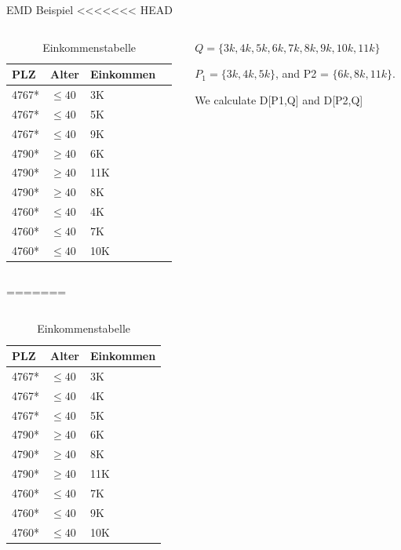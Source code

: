 \begin{frame} {EMD Beispiel}
<<<<<<< HEAD

\begin{columns}[T]
  \begin{column}{0.5\textwidth}
    \begin{table}[]
      \centering
      \label{tclossenessExample}
      \begin{tabular}{|l|l|l|l}
      \hline
      \textbf{PLZ}   & \textbf{Alter}    & \textbf{Einkommen} \\\hline
      4767* & $\le 40$ & 3K \\
      4767* & $\le 40$ & 5K \\
      4767* & $\le 40$ & 9K \\\hline
      4790* & $\ge 40$ & 6K \\
      4790* & $\ge 40$ & 11K \\
      4790* & $\ge 40$ & 8K \\\hline
      4760* & $\le 40$ & 4K \\
      4760* & $\le 40$ & 7K \\
      4760* & $\le 40$ & 10K \\\hline
      \end{tabular}
      \caption{Einkommenstabelle}
    \end{table}
    \end{column}

      \begin{column}{0.5\textwidth}
        $Q = \{3k, 4k, 5k, 6k, 7k, 8k, 9k, 10k, 11k\}$
        
        $P_1 = \{3k, 4k, 5k\}$, and P2 = \(\{6k, 8k, 11k\}\). 
        
        We calculate
        D[P1,Q] and D[P2,Q]
    \end{column}
\end{columns}
=======
	
	\begin{columns}[T]
		\begin{column}{0.5\textwidth}
			\begin{table}[]
				\centering
				\label{tclossenessExample}
				\begin{tabular}{|l|l|l|}
					\hline
					\textbf{PLZ}   & \textbf{Alter}    & \textbf{Einkommen} \\\hline
					4767* & $\le 40$ & 3K \\
					4767* & $\le 40$ & 4K \\
					4767* & $\le 40$ & 5K \\\hline
					4790* & $\ge 40$ & 6K \\
					4790* & $\ge 40$ & 8K \\
					4790* & $\ge 40$ & 11K \\\hline
					4760* & $\le 40$ & 7K \\
					4760* & $\le 40$ & 9K \\
					4760* & $\le 40$ & 10K \\\hline
				\end{tabular}
				\caption{Einkommenstabelle}
			\end{table}
		\end{column}
		

\end{columns}
\end{frame}
